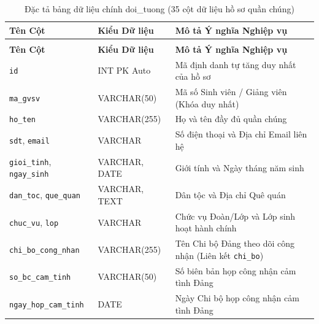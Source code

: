 \documentclass[12pt,a4paper]{report}
\begin{document}
{\fontsize{9pt}{11.5pt}\selectfont
  \begin{xltabular}{\linewidth}{|>{\raggedright\arraybackslash}p{4.8cm}|>{\raggedright\arraybackslash}p{2.8cm}|>{\raggedright\arraybackslash}X|}
    \caption{Đặc tả bảng dữ liệu chính doi\_tuong (35 cột dữ liệu hồ sơ quần chúng)} \label{tab:doi_tuong_schema} \\
    \hline
    \textbf{Tên Cột} & \textbf{Kiểu Dữ liệu} & \textbf{Mô tả Ý nghĩa Nghiệp vụ} \\ \hline
    \endfirsthead
     \\ \hline
    \textbf{Tên Cột} & \textbf{Kiểu Dữ liệu} & \textbf{Mô tả Ý nghĩa Nghiệp vụ} \\ \hline
    \endhead
    \hline
    \endfoot
    \texttt{id}                                          & INT PK Auto   & Mã định danh tự tăng duy nhất của hồ sơ                        \\ \hline
    \texttt{ma\_gvsv}                                    & VARCHAR(50)   & Mã số Sinh viên / Giảng viên (Khóa duy nhất)                   \\ \hline
    \texttt{ho\_ten}                                     & VARCHAR(255)  & Họ và tên đầy đủ quần chúng                                    \\ \hline
    \texttt{sdt}, \texttt{email}                         & VARCHAR       & Số điện thoại và Địa chỉ Email liên hệ                         \\ \hline
    \texttt{gioi\_tinh}, \texttt{ngay\_sinh}             & VARCHAR, DATE & Giới tính và Ngày tháng năm sinh                               \\ \hline
    \texttt{dan\_toc}, \texttt{que\_quan}                & VARCHAR, TEXT & Dân tộc và Địa chỉ Quê quán                                    \\ \hline
    \texttt{chuc\_vu}, \texttt{lop}                      & VARCHAR       & Chức vụ Đoàn/Lớp và Lớp sinh hoạt hành chính                   \\ \hline
    \texttt{chi\_bo\_cong\_nhan}                         & VARCHAR(255)  & Tên Chi bộ Đảng theo dõi công nhận (Liên kết \texttt{chi\_bo}) \\ \hline
    \texttt{so\_bc\_cam\_tinh}                           & VARCHAR(50)   & Số biên bản họp công nhận cảm tình Đảng                        \\ \hline
    \texttt{ngay\_hop\_cam\_tinh}                        & DATE          & Ngày Chi bộ họp công nhận cảm tình Đảng                        \\ \hline

\end{xltabular}}
\end{document}
